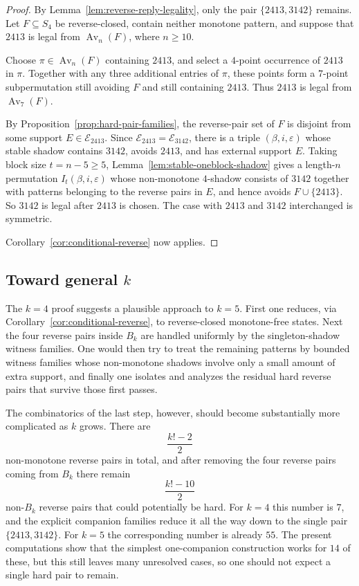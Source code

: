 \documentclass[11pt]{amsart}
\newcommand{\Sym}{S}
\newcommand{\Av}{\operatorname{Av}}
\theoremstyle{plain}
\theoremstyle{definition}
\theoremstyle{remark}
\begin{document}
\begin{proof}
  By Lemma~\ref{lem:reverse-reply-legality}, only the pair $\{2413,3142\}$ remains.  Let
  $F \subseteq \Sym_4$ be reverse-closed, contain neither monotone pattern, and suppose that $2413$ is
  legal from $\Av_n(F)$, where $n \geq 10$.

  Choose $\pi \in \Av_n(F)$ containing $2413$, and select a $4$-point occurrence of $2413$ in $\pi$.
  Together with any three additional entries of $\pi$, these points form a $7$-point subpermutation
  still avoiding $F$ and still containing $2413$.  Thus $2413$ is legal from $\Av_7(F)$.

  By Proposition~\ref{prop:hard-pair-families}, the reverse-pair set of $F$ is disjoint from some
  support $E \in \mathcal{E}_{2413}$.  Since $\mathcal{E}_{2413}=\mathcal{E}_{3142}$, there is a
  triple $(\beta,i,\varepsilon)$ whose stable shadow contains $3142$, avoids $2413$, and has external
  support $E$.  Taking block size $t=n-5 \geq 5$, Lemma~\ref{lem:stable-oneblock-shadow} gives a
  length-$n$ permutation
  $I_t(\beta,i,\varepsilon)$ whose non-monotone $4$-shadow consists of $3142$ together with patterns
  belonging to the reverse pairs in $E$, and hence avoids $F \cup \{2413\}$.  So $3142$ is legal after
  $2413$ is chosen.  The case with $2413$ and $3142$ interchanged is symmetric.

  Corollary~\ref{cor:conditional-reverse} now applies.
\end{proof}

\subsection{Toward general \texorpdfstring{$k$}{k}}

The $k=4$ proof suggests a plausible approach to $k=5$.
First one reduces, via Corollary~\ref{cor:conditional-reverse}, to reverse-closed
monotone-free states.  Next the four reverse pairs inside $B_k$ are handled uniformly by the
singleton-shadow witness families.  One would then try to treat the remaining patterns by bounded witness
families whose non-monotone shadows involve only a small amount of extra support, and finally one
isolates and analyzes the residual hard reverse pairs that survive those first passes.

The combinatorics of the last step, however, should become substantially more complicated as $k$
grows.  There are
\[
  \frac{k!-2}{2}
\]
non-monotone reverse pairs in total, and after removing the four reverse pairs coming from $B_k$
there remain
\[
  \frac{k!-10}{2}
\]
non-$B_k$ reverse pairs that could potentially be hard.  For $k=4$ this number is $7$, and the
explicit companion families reduce it all the way down to the single pair $\{2413,3142\}$.  For
$k=5$ the corresponding number is already $55$.  The present computations show that the simplest
one-companion construction works for $14$ of these, but this still leaves
many unresolved cases, so one should not expect a single hard pair to remain.
\end{document}
